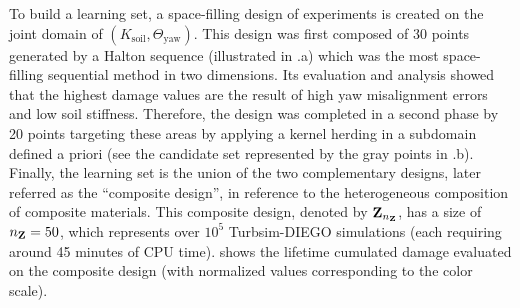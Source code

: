 To build a learning set, a space-filling design of experiments is created on the joint domain of $(K_{\mathrm{soil}}, \Theta_{\mathrm{yaw}})$. 
This design was first composed of 30 points generated by a Halton sequence (illustrated in .a) which was the most space-filling sequential method in two dimensions. 
Its evaluation and analysis showed that the highest damage values are the result of high yaw misalignment errors and low soil stiffness. 
Therefore, the design was completed in a second phase by 20 points targeting these areas by applying a kernel herding in a subdomain defined a priori (see the candidate set represented by the gray points in .b). 
Finally, the learning set is the union of the two complementary designs, later referred as the ``composite design'', in reference to the heterogeneous composition of composite materials. 
This composite design, denoted by ${\bf Z}_{n_{\bf Z}}$, has a size of $n_{\bf Z}=50$, which represents over $10^5$ Turbsim-DIEGO simulations (each requiring around 45 minutes of CPU time).
 shows the lifetime cumulated damage evaluated on the composite design (with normalized values corresponding to the color scale). 



